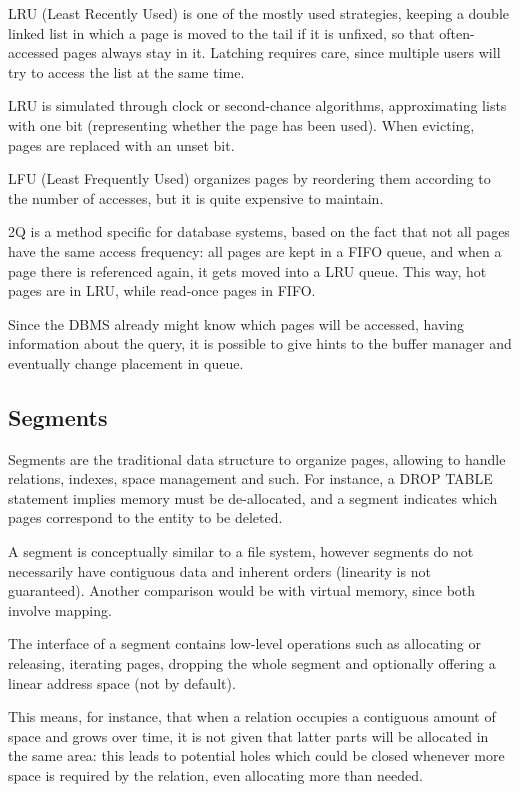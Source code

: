 LRU (Least Recently Used) is one of the mostly used strategies, keeping a double linked list in which a page is moved to the tail if it is unfixed, so that often-accessed pages always stay in it. Latching requires care, since multiple users will try to access the list at the same time.

LRU is simulated through clock or second-chance algorithms, approximating lists with one bit (representing whether the page has been used). When evicting, pages are replaced with an unset bit. 

LFU (Least Frequently Used) organizes pages by reordering them according to the number of accesses, but it is quite expensive to maintain. 

2Q is a method specific for database systems, based on the fact that not all pages have the same access frequency: all pages are kept in a FIFO queue, and when a page there is referenced again, it gets moved into a LRU queue. This way, hot pages are in LRU, while read-once pages in FIFO.

Since the DBMS already might know which pages will be accessed, having information about the query, it is possible to give hints to the buffer manager and eventually change placement in queue.

\subsection{Segments}
Segments are the traditional data structure to organize pages, allowing to handle relations, indexes, space management and such. For instance, a DROP TABLE statement implies memory must be de-allocated, and a segment indicates which pages correspond to the entity to be deleted.

A segment is conceptually similar to a file system, however segments do not necessarily have contiguous data and inherent orders (linearity is not guaranteed). Another comparison would be with virtual memory, since both involve mapping.

The interface of a segment contains low-level operations such as allocating or releasing, iterating pages, dropping the whole segment and optionally offering a linear address space (not by default).

This means, for instance, that when a relation occupies a contiguous amount of space and grows over time, it is not given that latter parts will be allocated in the same area: this leads to potential holes which could be closed whenever more space is required by the relation, even allocating more than needed. 

